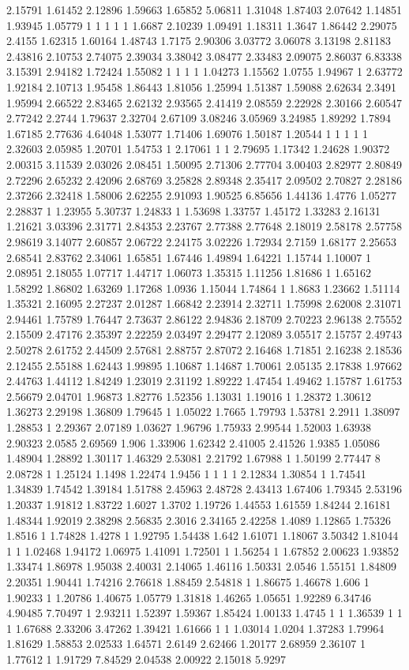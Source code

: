 2.15791 1.61452 2.12896 1.59663 1.65852 5.06811 1.31048 1.87403 2.07642 1.14851 1.93945 1.05779 1 1 1 1 1 1.6687 2.10239 1.09491 1.18311 1.3647 1.86442 2.29075 2.4155 1.62315 1.60164 1.48743 1.7175 2.90306 3.03772 3.06078 3.13198 2.81183 2.43816 2.10753 2.74075 2.39034 3.38042 3.08477 2.33483 2.09075 2.86037 6.83338 3.15391 2.94182 1.72424 1.55082 1 1 1 1 1.04273 1.15562 1.0755 1.94967 1 2.63772 1.92184 2.10713 1.95458 1.86443 1.81056 1.25994 1.51387 1.59088 2.62634 2.3491 1.95994 2.66522 2.83465 2.62132 2.93565 2.41419 2.08559 2.22928 2.30166 2.60547 2.77242 2.2744 1.79637 2.32704 2.67109 3.08246 3.05969 3.24985 1.89292 1.7894 1.67185 2.77636 4.64048 1.53077 1.71406 1.69076 1.50187 1.20544 1 1 1 1 1 2.32603 2.05985 1.20701 1.54753 1 2.17061 1 1 2.79695 1.17342 1.24628 1.90372 2.00315 3.11539 2.03026 2.08451 1.50095 2.71306 2.77704 3.00403 2.82977 2.80849 2.72296 2.65232 2.42096 2.68769 3.25828 2.89348 2.35417 2.09502 2.70827 2.28186 2.37266 2.32418 1.58006 2.62255 2.91093 1.90525 6.85656 1.44136 1.4776 1.05277 2.28837 1 1.23955 5.30737 1.24833 1 1.53698 1.33757 1.45172 1.33283 2.16131 1.21621 3.03396 2.31771 2.84353 2.23767 2.77388 2.77648 2.18019 2.58178 2.57758 2.98619 3.14077 2.60857 2.06722 2.24175 3.02226 1.72934 2.7159 1.68177 2.25653 2.68541 2.83762 2.34061 1.65851 1.67446 1.49894 1.64221 1.15744 1.10007 1 2.08951 2.18055 1.07717 1.44717 1.06073 1.35315 1.11256 1.81686 1 1.65162 1.58292 1.86802 1.63269 1.17268 1.0936 1.15044 1.74864 1 1.8683 1.23662 1.51114 1.35321 2.16095 2.27237 2.01287 1.66842 2.23914 2.32711 1.75998 2.62008 2.31071 2.94461 1.75789 1.76447 2.73637 2.86122 2.94836 2.18709 2.70223 2.96138 2.75552 2.15509 2.47176 2.35397 2.22259 2.03497 2.29477 2.12089 3.05517 2.15757 2.49743 2.50278 2.61752 2.44509 2.57681 2.88757 2.87072 2.16468 1.71851 2.16238 2.18536 2.12455 2.55188 1.62443 1.99895 1.10687 1.14687 1.70061 2.05135 2.17838 1.97662 2.44763 1.44112 1.84249 1.23019 2.31192 1.89222 1.47454 1.49462 1.15787 1.61753 2.56679 2.04701 1.96873 1.82776 1.52356 1.13031 1.19016 1 1.28372 1.30612 1.36273 2.29198 1.36809 1.79645 1 1.05022 1.7665 1.79793 1.53781 2.2911 1.38097 1.28853 1 2.29367 2.07189 1.03627 1.96796 1.75933 2.99544 1.52003 1.63938 2.90323 2.0585 2.69569 1.906 1.33906 1.62342 2.41005 2.41526 1.9385 1.05086 1.48904 1.28892 1.30117 1.46329 2.53081 2.21792 1.67988 1 1.50199 2.77447 8 2.08728 1 1.25124 1.1498 1.22474 1.9456 1 1 1 1 2.12834 1.30854 1 1.74541 1.34839 1.74542 1.39184 1.51788 2.45963 2.48728 2.43413 1.67406 1.79345 2.53196 1.20337 1.91812 1.83722 1.6027 1.3702 1.19726 1.44553 1.61559 1.84244 2.16181 1.48344 1.92019 2.38298 2.56835 2.3016 2.34165 2.42258 1.4089 1.12865 1.75326 1.8516 1 1.74828 1.4278 1 1.92795 1.54438 1.642 1.61071 1.18067 3.50342 1.81044 1 1 1.02468 1.94172 1.06975 1.41091 1.72501 1 1.56254 1 1.67852 2.00623 1.93852 1.33474 1.86978 1.95038 2.40031 2.14065 1.46116 1.50331 2.0546 1.55151 1.84809 2.20351 1.90441 1.74216 2.76618 1.88459 2.54818 1 1.86675 1.46678 1.606 1 1.90233 1 1.20786 1.40675 1.05779 1.31818 1.46265 1.05651 1.92289 6.34746 4.90485 7.70497 1 2.93211 1.52397 1.59367 1.85424 1.00133 1.4745 1 1 1.36539 1 1 1 1.67688 2.33206 3.47262 1.39421 1.61666 1 1 1.03014 1.0204 1.37283 1.79964 1.81629 1.58853 2.02533 1.64571 2.6149 2.62466 1.20177 2.68959 2.36107 1 1.77612 1 1.91729 7.84529 2.04538 2.00922 2.15018 5.9297 